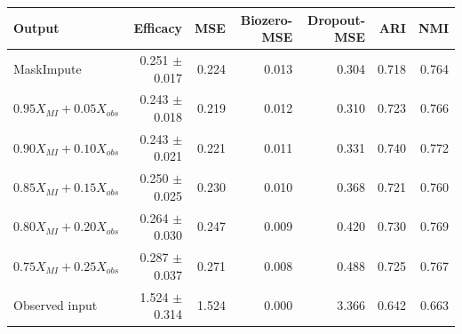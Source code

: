 \begin{tabular}{lrrrrrr}
\toprule
Output & Efficacy & MSE & Biozero-MSE & Dropout-MSE & ARI & NMI \\
\midrule
MaskImpute & 0.251 $\pm$ 0.017 & 0.224 & 0.013 & 0.304 & 0.718 & 0.764 \\
$0.95X_{MI}+0.05X_{obs}$ & 0.243 $\pm$ 0.018 & 0.219 & 0.012 & 0.310 & 0.723 & 0.766 \\
$0.90X_{MI}+0.10X_{obs}$ & 0.243 $\pm$ 0.021 & 0.221 & 0.011 & 0.331 & 0.740 & 0.772 \\
$0.85X_{MI}+0.15X_{obs}$ & 0.250 $\pm$ 0.025 & 0.230 & 0.010 & 0.368 & 0.721 & 0.760 \\
$0.80X_{MI}+0.20X_{obs}$ & 0.264 $\pm$ 0.030 & 0.247 & 0.009 & 0.420 & 0.730 & 0.769 \\
$0.75X_{MI}+0.25X_{obs}$ & 0.287 $\pm$ 0.037 & 0.271 & 0.008 & 0.488 & 0.725 & 0.767 \\
Observed input & 1.524 $\pm$ 0.314 & 1.524 & 0.000 & 3.366 & 0.642 & 0.663 \\
\bottomrule
\end{tabular}

